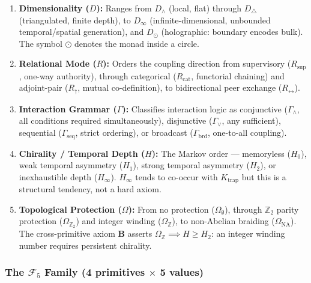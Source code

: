\documentclass[12pt,a4paper]{article}
\begin{document}
\begin{enumerate}
    \item \textbf{Dimensionality ($D$):} Ranges from $D_{\wedge}$ (local, flat) through $D_{\triangle}$ (triangulated, finite depth), to $D_{\infty}$ (infinite-dimensional, unbounded temporal/spatial generation), and $D_{\odot}$ (holographic: boundary encodes bulk). The symbol $\odot$ denotes the monad inside a circle.
    \item \textbf{Relational Mode ($R$):} Orders the coupling direction from supervisory ($R_\text{sup}$, one-way authority), through categorical ($R_\text{cat}$, functorial chaining) and adjoint-pair ($R_{\dagger}$, mutual co-definition), to bidirectional peer exchange ($R_{\leftrightarrow}$).
    \item \textbf{Interaction Grammar ($\Gamma$):} Classifies interaction logic as conjunctive ($\Gamma_{\wedge}$, all conditions required simultaneously), disjunctive ($\Gamma_{\vee}$, any sufficient), sequential ($\Gamma_\text{seq}$, strict ordering), or broadcast ($\Gamma_\text{brd}$, one-to-all coupling).
    \item \textbf{Chirality / Temporal Depth ($H$):} The Markov order --- memoryless ($H_0$), weak temporal asymmetry ($H_1$), strong temporal asymmetry ($H_2$), or inexhaustible depth ($H_{\infty}$). $H_{\infty}$ tends to co-occur with $K_\text{trap}$ but this is a structural tendency, not a hard axiom.
    \item \textbf{Topological Protection ($\Omega$):} From no protection ($\Omega_{\emptyset}$), through $\mathbb{Z}_2$ parity protection ($\Omega_{\mathbb{Z}_2}$) and integer winding ($\Omega_\mathbb{Z}$), to non-Abelian braiding ($\Omega_\text{NA}$). The cross-primitive axiom \textbf{B} asserts $\Omega_\mathbb{Z} \implies H \geq H_2$: an integer winding number requires persistent chirality.
\end{enumerate}

\subsubsection{The $\mathcal{F}_5$ Family (4 primitives $\times$ 5 values)}
\end{document}
